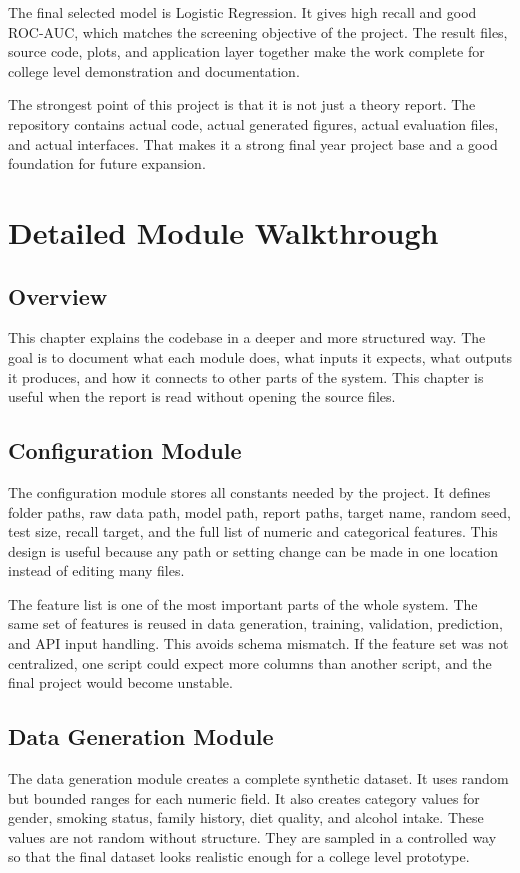 \documentclass[12pt,a4paper,openany]{report}
\begin{document}
    The final selected model is Logistic Regression. It gives high recall and good ROC-AUC, which matches the screening objective of the project. The result files, source code, plots, and application layer together make the work complete for college level demonstration and documentation.

    The strongest point of this project is that it is not just a theory report. The repository contains actual code, actual generated figures, actual evaluation files, and actual interfaces. That makes it a strong final year project base and a good foundation for future expansion.

    \chapter{Detailed Module Walkthrough}
    \section{Overview}
    This chapter explains the codebase in a deeper and more structured way. The goal is to document what each module does, what inputs it expects, what outputs it produces, and how it connects to other parts of the system. This chapter is useful when the report is read without opening the source files.

    \section{Configuration Module}
    The configuration module stores all constants needed by the project. It defines folder paths, raw data path, model path, report paths, target name, random seed, test size, recall target, and the full list of numeric and categorical features. This design is useful because any path or setting change can be made in one location instead of editing many files.

    The feature list is one of the most important parts of the whole system. The same set of features is reused in data generation, training, validation, prediction, and API input handling. This avoids schema mismatch. If the feature set was not centralized, one script could expect more columns than another script, and the final project would become unstable.

    \section{Data Generation Module}
    The data generation module creates a complete synthetic dataset. It uses random but bounded ranges for each numeric field. It also creates category values for gender, smoking status, family history, diet quality, and alcohol intake. These values are not random without structure. They are sampled in a controlled way so that the final dataset looks realistic enough for a college level prototype.
\end{document}
